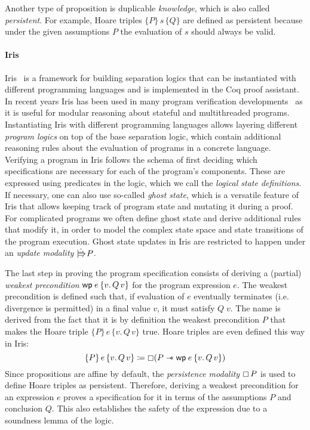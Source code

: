 Another type of proposition is duplicable \emph{knowledge}, which is also called \emph{persistent}.
For example, Hoare triples \(\{P\}\,s\,\{Q\}\) are defined as persistent because under the given assumptions \(P\) the evaluation of \(s\) should always be valid.

\paragraph{Iris}
Iris~\cite{jung2018iris} is a framework for building separation logics that can be instantiated with different programming languages and is implemented in the Coq proof assistant.
In recent years Iris has been used in many program verification developments~\cite{hammond2024axiomatic,jung2017rustbelt,rao2023iris} as it is useful for modular reasoning about stateful and multithreaded programs.
Instantiating Iris with different programming languages allows layering different \emph{program logics} on top of the base separation logic, which contain additional reasoning rules about the evaluation of programs in a concrete language.
Verifying a program in Iris follows the schema of first deciding which specifications are necessary for each of the program's components.
These are expressed using predicates in the logic, which we call the \emph{logical state definitions}.
If necessary, one can also use so-called \emph{ghost state},
which is a versatile feature of Iris that allows keeping track of program state and mutating it during a proof.
For complicated programs we often define ghost state and derive additional rules that modify it, in order to model the complex state space and state transitions of the program execution.
Ghost state updates in Iris are restricted to happen under an \emph{update modality} \(\upd P\).

The last step in proving the program specification consists of deriving a (partial) \emph{weakest precondition} \(\wpre{e}{v.\, Q\, v}\) for the program expression \(e\).
The weakest precondition is defined such that, if evaluation of \(e\) eventually terminates (i.e. divergence is permitted) in a final value \(v\), it must satisfy \(Q\; v\).
The name is derived from the fact that it is by definition the weakest precondition \(P\) that makes the Hoare triple \(\{P\}\,e\,\{v.\,Q\,v\}\) true.
Hoare triples are even defined this way in Iris:
\[
    \{P\}\,e\,\{v.\,Q\,v\} \coloneq \always (P \wand \wpre{e}{v.\, Q\, v})
\]
Since propositions are affine by default, the \emph{persistence modality} \(\mathop{\boxempty} P\) is used to define Hoare triples as persistent.
Therefore, deriving a weakest precondition for an expression \(e\) proves a specification for it in terms of the assumptions \(P\) and conclusion \(Q\).
This also establishes the safety of the expression due to a soundness lemma of the logic.

